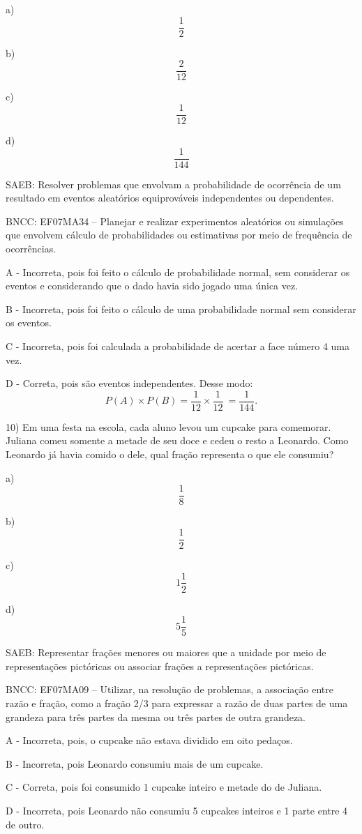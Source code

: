 a)\[\frac{1}{2}\]

b)\[\frac{2}{12}\]

c)\[\frac{1}{12}\]

d)\[\frac{1}{144}\]

SAEB: Resolver problemas que envolvam a probabilidade de ocorrência de
um resultado em eventos aleatórios equiprováveis independentes ou
dependentes.

BNCC: EF07MA34 -- Planejar e realizar experimentos aleatórios ou
simulações que envolvem cálculo de probabilidades ou estimativas por
meio de frequência de ocorrências.

A - Incorreta, pois foi feito o cálculo de probabilidade normal, sem
considerar os eventos e considerando que o dado havia sido jogado uma
única vez.

B - Incorreta, pois foi feito o cálculo de uma probabilidade normal sem
considerar os eventos.

C - Incorreta, pois foi calculada a probabilidade de acertar a face
número 4 uma vez.

D - Correta, pois são eventos independentes. Desse modo:
\[P\left( A \right) \times P\left( B \right) = \frac{1}{12} \times \frac{1}{12}\  = \frac{1}{144}.\]

10) Em uma festa na escola, cada aluno levou um cupcake para comemorar.
Juliana comeu somente a metade de seu doce e cedeu o resto a Leonardo.
Como Leonardo já havia comido o dele, qual fração representa o que ele
consumiu?

a)\[\frac{1}{8}\]

b)\[\frac{1}{2}\]

c)\[1\frac{1}{2}\]

d)\[5\frac{1}{5}\]

SAEB: Representar frações menores ou maiores que a unidade por meio de
representações pictóricas ou associar frações a representações
pictóricas.

BNCC: EF07MA09 -- Utilizar, na resolução de problemas, a associação
entre razão e fração, como a fração 2/3 para expressar a razão de duas
partes de uma grandeza para três partes da mesma ou três partes de outra
grandeza.

A - Incorreta, pois, o cupcake não estava dividido em oito pedaços.

B - Incorreta, pois Leonardo consumiu mais de um cupcake.

C - Correta, pois foi consumido 1 cupcake inteiro e metade do de
Juliana.

D - Incorreta, pois Leonardo não consumiu 5 cupcakes inteiros e 1 parte
entre 4 de outro.


